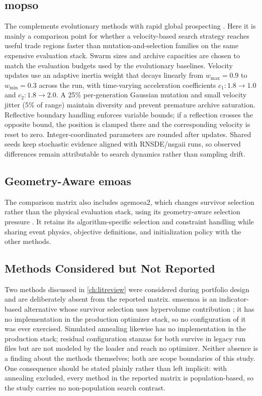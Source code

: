     \subsection{\gls{mopso}} \label{ss:mopso}
        The  complements evolutionary methods with rapid global prospecting \cite{coello2002mopso}. Here it is mainly a comparison point for whether a velocity-based search strategy reaches useful trade regions faster than mutation-and-selection families on the same expensive evaluation stack. Swarm sizes and archive capacities are chosen to match the evaluation budgets used by the evolutionary baselines. Velocity updates use an adaptive inertia weight that decays linearly from \(w_{\max}=0.9\) to \(w_{\min}=0.3\) across the run, with time-varying acceleration coefficients \(c_1:1.8\to1.0\) and \(c_2:1.8\to2.0\). A 25\% per-generation Gaussian mutation and small velocity jitter (5\% of range) maintain diversity and prevent premature archive saturation. Reflective boundary handling enforces variable bounds; if a reflection crosses the opposite bound, the position is clamped there and the corresponding velocity is reset to zero. Integer-coordinated parameters are rounded after updates. Shared  seeds keep stochastic evidence aligned with RNSDE/\gls{nsgaii} runs, so observed differences remain attributable to search dynamics rather than sampling drift.

    \subsection{Geometry-Aware \glspl{emoa}}
        The comparison matrix also includes \gls{agemoea2}, which changes survivor selection rather than the physical evaluation stack, using its geometry-aware selection pressure \cite{panichella2022agemoea2}. It retains its algorithm-specific selection and constraint handling while sharing event physics, objective definitions, and initialization policy with the other methods.

    \subsection{Methods Considered but Not Reported} \label{ss:notreported}
        Two methods discussed in \cref{ch:litreview} were considered during portfolio design and are deliberately absent from the reported matrix. \gls{smsemoa} is an indicator-based alternative whose survivor selection uses hypervolume contribution \cite{beume2007smsemoa}; it has no implementation in the production optimizer stack, so no configuration of it was ever exercised. Simulated annealing \cite{kirkpatrick1983sa} likewise has no implementation in the production stack; residual configuration stanzas for both survive in legacy run files but are not modeled by the loader and reach no optimizer. Neither absence is a finding about the methods themselves; both are scope boundaries of this study. One consequence should be stated plainly rather than left implicit: with annealing excluded, every method in the reported matrix is population-based, so the study carries no non-population search contrast.

